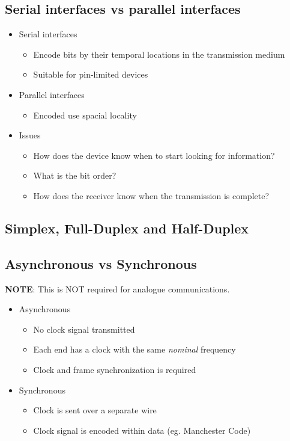 \subsection{Serial interfaces vs parallel interfaces}
\begin{itemize}
    \item Serial interfaces
        \begin{itemize}
            \item Encode bits by their temporal locations in the transmission medium
            \item Suitable for pin-limited devices
        \end{itemize}
    \item Parallel interfaces
    \begin{itemize}
        \item Encoded use spacial locality
    \end{itemize}
    \item Issues
    \begin{itemize}
        \item How does the device know when to start looking for information?
        \item What is the bit order?
        \item How does the receiver know when the transmission is complete?
    \end{itemize}
\end{itemize}

\subsection{Simplex, Full-Duplex and Half-Duplex}


\subsection{Asynchronous vs Synchronous}

\noindent \textbf{NOTE}: This is NOT required for analogue communications.

\begin{itemize}
    \item Asynchronous
    \begin{itemize}
        \item No clock signal transmitted
        \item Each end has a clock with the same \textit{nominal} frequency
        \item Clock and frame synchronization is required
    \end{itemize}
    \item Synchronous
    \begin{itemize}
        \item Clock is sent over a separate wire
        \item Clock signal is encoded within data (eg. Manchester Code)
    \end{itemize}
\end{itemize}

